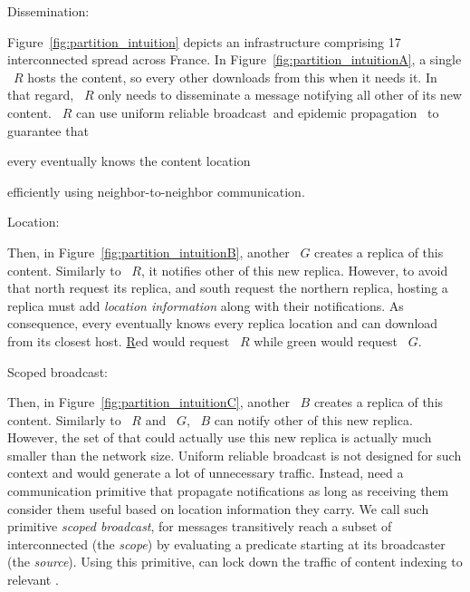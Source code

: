 \begin{asparadesc}
\item [Dissemination:]

Figure~\ref{fig:partition_intuition} depicts an infrastructure
comprising 17 interconnected \processes spread across France. In
Figure~\ref{fig:partition_intuitionA}, a single \Process~$R$ hosts the
content, so every other \process downloads from this \process when it
needs it. In that regard, \Process~$R$ only needs to disseminate a
message notifying all other \processes of its new content. \Process~$R$
can use uniform reliable broadcast~\REF and epidemic propagation~\REF
to guarantee that
\begin{inparaenum}[(i)]
\item every \process eventually knows the content location
\item efficiently using neighbor-to-neighbor communication.
\end{inparaenum}

\item [Location:]

Then, in Figure~\ref{fig:partition_intuitionB}, another \Process~$G$
creates a replica of this content. Similarly to \Process~$R$, it
notifies other \processes of this new replica. However, to avoid that
north \processes request its replica, and south \processes request the
northern replica, \processes hosting a replica must add \emph{location
information} along with their notifications. As consequence, every
\process eventually knows every replica location and can download from
its closest host. \underline{R}ed \processes would request
\Process~$R$ while \underline{g}reen \processes would request
\Process~$G$.

\item [Scoped broadcast:]

Then, in Figure~\ref{fig:partition_intuitionC}, another \Process~$B$
creates a replica of this content. Similarly to \Process~$R$ and
\Process~$G$, \Process~$B$ can notify other \processes of this new
replica. However, the set of \processes that could actually use this
new replica is actually much smaller than the network size. Uniform
reliable broadcast is not designed for such context and would generate
a lot of unnecessary traffic. Instead, \processes need a communication
primitive that propagate notifications as long as \processes receiving
them consider them useful based on location information they carry. We
call such primitive \emph{scoped broadcast}, for messages transitively
reach a subset of interconnected \processes (the \emph{scope}) by
evaluating a predicate starting at its broadcaster (the
\emph{source}). Using this primitive, \processes can lock down the
traffic of content indexing to relevant \processes.


\end{asparadesc}
